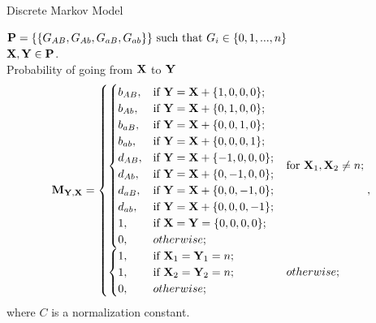 \documentclass{beamer}
\begin{document}
\begin{frame}{Discrete Markov Model}
\footnotesize

$\bold{P} = \{\{G_{AB},G_{Ab},G_{aB},G_{ab}\}\} \text{ such that } G_i\in\{0,1,...,n\}$\\ 
$\bold{X},\bold{Y} \in \bold{P}$. \\

Probability of going from $\bold{X}$ to $\bold{Y}$
\begin{equation*}
\bold{M}_{\bold{Y},\bold{X}}=
\begin{aligned}
\begin{cases}
\begin{cases}
    b_{AB}, & \text{if } \bold{Y} = \bold{X} + \{1,0,0,0\}; \\
    b_{Ab}, & \text{if } \bold{Y} = \bold{X} + \{0,1,0,0\};  \\
    b_{aB}, & \text{if } \bold{Y} = \bold{X} + \{0,0,1,0\}; \\
    b_{ab}, & \text{if } \bold{Y} = \bold{X} + \{0,0,0,1\}; \\
    d_{AB}, & \text{if } \bold{Y} = \bold{X} + \{-1,0,0,0\}; \\
    d_{Ab}, & \text{if } \bold{Y} = \bold{X} + \{0,-1,0,0\};  \\
    d_{aB}, & \text{if } \bold{Y} = \bold{X} + \{0,0,-1,0\}; \\
    d_{ab}, & \text{if } \bold{Y} = \bold{X} + \{0,0,0,-1\}; \\
    1, & \text{if}\ \bold{X} = \bold{Y} = \{0,0,0,0\}; \\
    0, & otherwise;
\end{cases}  & \text{for}\ \bold{X}_1, \bold{X}_2 \neq n; \\
\begin{cases} 
    1, & \text{if}\ \bold{X}_1 = \bold{Y}_1 = n; \\
    1, & \text{if}\ \bold{X}_2 = \bold{Y}_2 = n;  \\
    \mathrlap{0,}\hphantom{d_{AB},} & otherwise;
\end{cases} & otherwise;
\end{cases},
\end{aligned}
\end{equation*}
where $C$ is a normalization constant.
\normalsize

\end{frame}
\end{document}
